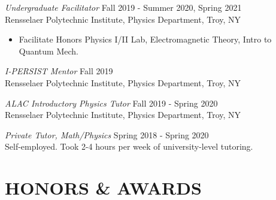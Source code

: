 \documentclass[margin]{rpires}
\begin{document}
\begin{resume}
    \textit{Undergraduate Facilitator} \hfill Fall 2019 - Summer 2020, Spring 2021 \\
    Rensselaer Polytechnic Institute, Physics Department, Troy, NY
    \begin{itemize}  \itemsep -2pt %
        \item Facilitate Honors Physics I/II Lab, Electromagnetic Theory, Intro to Quantum Mech.
    \end{itemize}

    \textit{I-PERSIST Mentor} \hfill Fall 2019 \\
    Rensselaer Polytechnic Institute, Physics Department, Troy, NY

    \textit{ALAC Introductory Physics Tutor} \hfill Fall 2019 - Spring 2020 \\
    Rensselaer Polytechnic Institute, Physics Department, Troy, NY

    \textit{Private Tutor, Math/Physics} \hfill Spring 2018 - Spring 2020 \\
    Self-employed. Took 2-4 hours per week of university-level tutoring.
    
    
\section{HONORS \& AWARDS} 


\end{resume}
\end{document}
